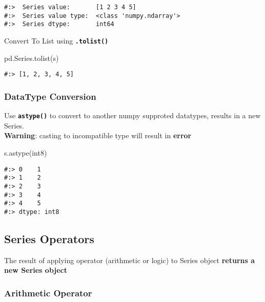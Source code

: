 \documentclass[
]{book}
\newenvironment{Shaded}{\begin{snugshade}}{\end{snugshade}}
\newcommand{\NormalTok}[1]{#1}
\newcommand{\StringTok}[1]{\textcolor[rgb]{0.5,0.5,0.5}{#1}}
\begin{document}
\begin{verbatim}
#:>  Series value:       [1 2 3 4 5] 
#:>  Series value type:  <class 'numpy.ndarray'> 
#:>  Series dtype:       int64
\end{verbatim}

Convert To List using \textbf{\texttt{.tolist()}}

\begin{Shaded}
\begin{Highlighting}[]
\NormalTok{pd.Series.tolist(s)}
\end{Highlighting}
\end{Shaded}

\begin{verbatim}
#:> [1, 2, 3, 4, 5]
\end{verbatim}

\hypertarget{datatype-conversion}{%
\subsubsection{DataType Conversion}\label{datatype-conversion}}

Use \textbf{\texttt{astype()}} to convert to another numpy supproted datatypes, results in a new Series.\\
\textbf{Warning}: casting to incompatible type will result in \textbf{error}

\begin{Shaded}
\begin{Highlighting}[]
\NormalTok{s.astype(}\StringTok{\textquotesingle{}int8\textquotesingle{}}\NormalTok{)}
\end{Highlighting}
\end{Shaded}

\begin{verbatim}
#:> 0    1
#:> 1    2
#:> 2    3
#:> 3    4
#:> 4    5
#:> dtype: int8
\end{verbatim}

\hypertarget{series-operators}{%
\subsection{Series Operators}\label{series-operators}}

The result of applying operator (arithmetic or logic) to Series object \textbf{returns a new Series object}

\hypertarget{arithmetic-operator}{%
\subsubsection{Arithmetic Operator}\label{arithmetic-operator}}
\end{document}
